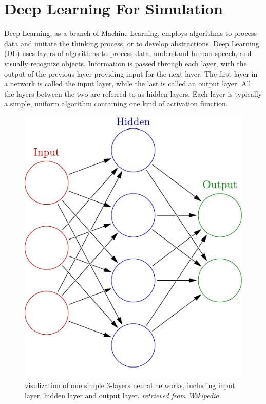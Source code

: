\chapter{Deep Learning For Simulation}
    Deep Learning, as a branch of Machine Learning, employs algorithms to process data and imitate the thinking process\cite{schmidhuber2015deep}, or to develop abstractions. Deep Learning (DL) uses layers of algorithms to process data, understand human speech, and visually recognize objects. Information is passed through each layer, with the output of the previous layer providing input for the next layer. The first layer in a network is called the input layer, while the last is called an output layer. All the layers between the two are referred to as hidden layers. Each layer is typically a simple, uniform algorithm containing one kind of activation function.  \\
    \begin{figure}[!ht]
        \centering
        \includegraphics[scale = 0.5]{Figures/Colored_neural_network}
        \caption{visulization of one simple $3$-layers neural networks, including input layer, hidden layer and output layer, \textit{retrieved from Wikipedia}}
    \end{figure}

